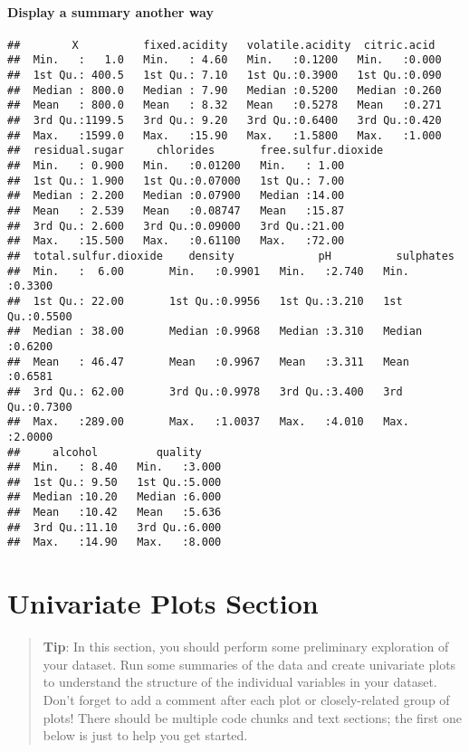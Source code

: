 \documentclass[]{article}
\let\oldparagraph\paragraph
\renewcommand{\paragraph}[1]{\oldparagraph{#1}\mbox{}}
\begin{document}
\paragraph{Display a summary another
way}\label{display-a-summary-another-way}

\begin{verbatim}
##        X          fixed.acidity   volatile.acidity  citric.acid   
##  Min.   :   1.0   Min.   : 4.60   Min.   :0.1200   Min.   :0.000  
##  1st Qu.: 400.5   1st Qu.: 7.10   1st Qu.:0.3900   1st Qu.:0.090  
##  Median : 800.0   Median : 7.90   Median :0.5200   Median :0.260  
##  Mean   : 800.0   Mean   : 8.32   Mean   :0.5278   Mean   :0.271  
##  3rd Qu.:1199.5   3rd Qu.: 9.20   3rd Qu.:0.6400   3rd Qu.:0.420  
##  Max.   :1599.0   Max.   :15.90   Max.   :1.5800   Max.   :1.000  
##  residual.sugar     chlorides       free.sulfur.dioxide
##  Min.   : 0.900   Min.   :0.01200   Min.   : 1.00      
##  1st Qu.: 1.900   1st Qu.:0.07000   1st Qu.: 7.00      
##  Median : 2.200   Median :0.07900   Median :14.00      
##  Mean   : 2.539   Mean   :0.08747   Mean   :15.87      
##  3rd Qu.: 2.600   3rd Qu.:0.09000   3rd Qu.:21.00      
##  Max.   :15.500   Max.   :0.61100   Max.   :72.00      
##  total.sulfur.dioxide    density             pH          sulphates     
##  Min.   :  6.00       Min.   :0.9901   Min.   :2.740   Min.   :0.3300  
##  1st Qu.: 22.00       1st Qu.:0.9956   1st Qu.:3.210   1st Qu.:0.5500  
##  Median : 38.00       Median :0.9968   Median :3.310   Median :0.6200  
##  Mean   : 46.47       Mean   :0.9967   Mean   :3.311   Mean   :0.6581  
##  3rd Qu.: 62.00       3rd Qu.:0.9978   3rd Qu.:3.400   3rd Qu.:0.7300  
##  Max.   :289.00       Max.   :1.0037   Max.   :4.010   Max.   :2.0000  
##     alcohol         quality     
##  Min.   : 8.40   Min.   :3.000  
##  1st Qu.: 9.50   1st Qu.:5.000  
##  Median :10.20   Median :6.000  
##  Mean   :10.42   Mean   :5.636  
##  3rd Qu.:11.10   3rd Qu.:6.000  
##  Max.   :14.90   Max.   :8.000
\end{verbatim}

\section{Univariate Plots Section}\label{univariate-plots-section}

\begin{quote}
\textbf{Tip}: In this section, you should perform some preliminary
exploration of your dataset. Run some summaries of the data and create
univariate plots to understand the structure of the individual variables
in your dataset. Don't forget to add a comment after each plot or
closely-related group of plots! There should be multiple code chunks and
text sections; the first one below is just to help you get started.
\end{quote}
\end{document}
